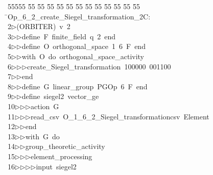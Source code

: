 %
%
\begin{tabbing}
55555 \= 55 \= 55 \= 55 \= 55 \= 55 \= 55 \= 55 \= 55 \= 55 \= 55 \= 55 \= 55 \= \>Op\_6\_2\_create\_Siegel\_transformation\_2C:\\[0pt]
2\>$\triangleright$\>(ORBITER)\ v\ 2\ \\[0pt]
3\>$\triangleright$\>$\triangleright$\>define\ F\ finite\_field\ q\ 2\ end\ \\[0pt]
4\>$\triangleright$\>$\triangleright$\>define\ O\ orthogonal\_space\ 1\ 6\ F\ end\ \\[0pt]
5\>$\triangleright$\>$\triangleright$\>with\ O\ do\ orthogonal\_space\_activity\ \\[0pt]
6\>$\triangleright$\>$\triangleright$\>$\triangleright$\>create\_Siegel\_transformation\ 100000\ 001100\ \\[0pt]
7\>$\triangleright$\>$\triangleright$\>end\ \\[0pt]
8\>$\triangleright$\>$\triangleright$\>define\ G\ linear\_group\ PGOp\ 6\ F\ end\ \\[0pt]
9\>$\triangleright$\>$\triangleright$\>define\ siegel2\ vector\_ge\ \\[0pt]
10\>$\triangleright$\>$\triangleright$\>$\triangleright$\>action\ G\ \\[0pt]
11\>$\triangleright$\>$\triangleright$\>$\triangleright$\>read\_csv\ O\_1\_6\_2\_Siegel\_transformationcsv\ Element\ \\[0pt]
12\>$\triangleright$\>$\triangleright$\>end\ \\[0pt]
13\>$\triangleright$\>$\triangleright$\>with\ G\ do\ \\[0pt]
14\>$\triangleright$\>$\triangleright$\>group\_theoretic\_activity\ \\[0pt]
15\>$\triangleright$\>$\triangleright$\>$\triangleright$\>element\_processing\ \\[0pt]
16\>$\triangleright$\>$\triangleright$\>$\triangleright$\>$\triangleright$\>input\ siegel2\ \\[0pt]

\end{tabbing}
